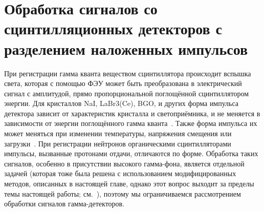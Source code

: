 \chapter{Обработка сигналов со сцинтилляционных детекторов с разделением наложенных импульсов}
\label{sec:signalProcessing}




При регистрации гамма кванта веществом сцинтиллятора происходит вспышка света, которая с помощью ФЭУ может быть преобразована в электрический сигнал с амплитудой, прямо пропорциональной поглощённой сцинтиллятором энергии. Для кристаллов NaI, LaBr3(Ce), BGO, и других форма импульса детектора зависит от характеристик кристалла и светоприёмника, и не меняется в зависимости от энергии поглощённого гамма кванта~\cite{Gin2008}. Также форма импульса их может меняться при изменении температуры, напряжения смещения или загрузки~\cite{Renker2009,Grodzicka2015}. При регистрации нейтронов органическими сцинтилляторами импульсы, вызванные протонами отдачи, отличаются по форме.  Обработка таких сигналов, особенно в присутствии высокого гамма-фона, является отдельной задачей (которая тоже была решена с использованием модифицированных методов, описанных в настоящей главе, однако этот вопрос выходит за пределы темы настоящей работы; см.~\cite{Iliasova2020}), поэтому мы ограничиваемся рассмотрением обработки сигналов гамма-детекторов. 

